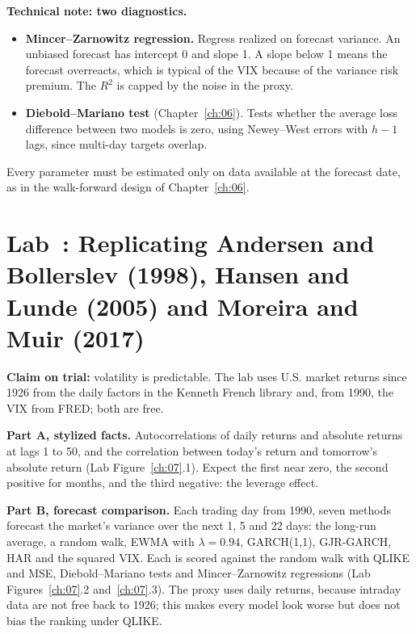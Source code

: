 \begin{technote}
\textbf{Technical note: two diagnostics.}
\begin{itemize}
  \item \textbf{Mincer--Zarnowitz regression.} Regress realized on forecast variance. An unbiased forecast has intercept 0 and slope 1. A slope below 1 means the forecast overreacts, which is typical of the VIX because of the variance risk premium. The $R^2$ is capped by the noise in the proxy.
  \item \textbf{Diebold--Mariano test} (Chapter~\ref{ch:06}). Tests whether the average loss difference between two models is zero, using Newey--West errors with $h - 1$ lags, since multi-day targets overlap.
\end{itemize}
\end{technote}

Every parameter must be estimated only on data available at the forecast date, as in the walk-forward design of Chapter~\ref{ch:06}.

\section{Lab~\thechapter: Replicating Andersen and Bollerslev (1998), Hansen and Lunde (2005) and Moreira and Muir (2017)}
\label{sec:10-lab}

\textbf{Claim on trial:} volatility is predictable. The lab uses U.S. market returns since 1926 from the daily factors in the Kenneth French library and, from 1990, the VIX from FRED; both are free.

\textbf{Part A, stylized facts.} Autocorrelations of daily returns and absolute returns at lags 1 to 50, and the correlation between today's return and tomorrow's absolute return (Lab Figure~\ref{ch:07}.1). Expect the first near zero, the second positive for months, and the third negative: the leverage effect.

\textbf{Part B, forecast comparison.} Each trading day from 1990, seven methods forecast the market's variance over the next 1, 5 and 22 days: the long-run average, a random walk, EWMA with $\lambda = 0.94$, GARCH(1,1), GJR-GARCH, HAR and the squared VIX. Each is scored against the random walk with QLIKE and MSE, Diebold--Mariano tests and Mincer--Zarnowitz regressions (Lab Figures~\ref{ch:07}.2 and~\ref{ch:07}.3). The proxy uses daily returns, because intraday data are not free back to 1926; this makes every model look worse but does not bias the ranking under QLIKE.

